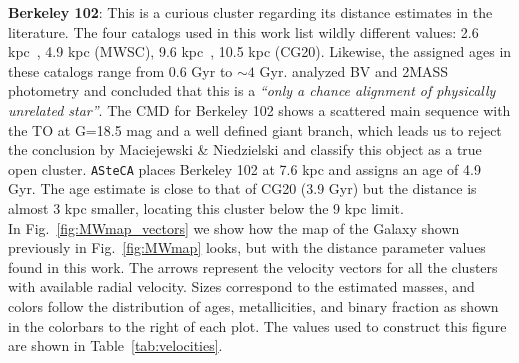 \documentclass{aa}
\begin{document}
  \textbf{Berkeley 102}: This is a curious cluster regarding its distance
  estimates in the literature. The four catalogs used in this work list wildly
  different values: 2.6 kpc~\citep[WEBDA;][]{Tadross_2008}, 4.9 kpc (MWSC),
  9.6 kpc~\citep[OC02;][]{Hasegawa_2008}, 10.5 kpc (CG20). Likewise, the
  assigned ages in these catalogs range from 0.6 Gyr to $\sim4$ Gyr.
  \cite{Maciejewski_2008} analyzed BV and 2MASS photometry and concluded that
  this is a \emph{``only a chance alignment of physically unrelated star''}.
  The CMD for Berkeley 102 shows a scattered main sequence with the TO at G=18.5
  mag and a well defined giant branch, which leads us to reject the conclusion
  by Maciejewski \& Niedzielski and classify this object as a true open cluster.
  \texttt{ASteCA} places Berkeley 102 at 7.6 kpc and assigns an age of 4.9 Gyr.
  The age estimate is close to that of CG20 (3.9 Gyr) but the distance is
  almost 3 kpc smaller, locating this cluster below the 9 kpc limit.\\



  In Fig.~\ref{fig:MWmap_vectors} we show how the map of the Galaxy shown
  previously in Fig.~\ref{fig:MWmap} looks, but with the distance parameter
  values found in this work. The arrows represent the velocity vectors for all
  the clusters with available radial velocity. Sizes correspond to the estimated
  masses, and colors follow the distribution of ages, metallicities, and binary
  fraction as shown in the colorbars to the right of each plot. The values used
  to construct this figure are shown in Table~\ref{tab:velocities}.
 
\end{document}
